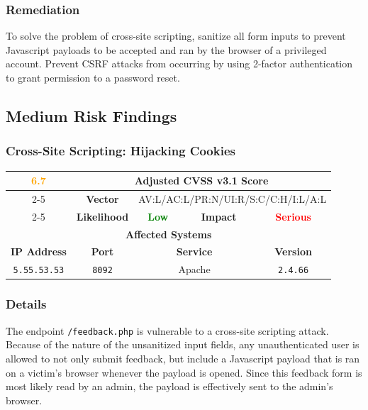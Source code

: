 \documentclass[12pt, letterpaper]{article}
\begin{document}
\subsubsection*{Remediation}

To solve the problem of cross-site scripting, sanitize all form
inputs to prevent Javascript payloads to be accepted and ran by the
browser of a privileged account. Prevent CSRF attacks from occurring
by using 2-factor authentication to grant permission to a password reset.

\clearpage
\subsection{Medium Risk Findings}
\subsubsection{Cross-Site Scripting: Hijacking Cookies}

\begin{table}[!ht]
  \centering
  \renewcommand{\arraystretch}{1.8} %
  \begin{tabular}{|c|c|c|c|c|}
    \hline
    \multirow{3}{*}{\textcolor{orange}{\textbf{\huge 6.7}}} &
    \multicolumn{4}{c|}{\textbf{Adjusted CVSS v3.1 Score}} \\ \cline{2-5}
    & \textbf{Vector} &
    \multicolumn{3}{c|}{AV:L/AC:L/PR:N/UI:R/S:C/C:H/I:L/A:L} \\ \cline{2-5}
    & \textbf{Likelihood} & \textcolor{green}{\textbf{Low}}
    & \textbf{Impact} & \textcolor{red}{\textbf{Serious}} \\ \hline
    \multicolumn{5}{|c|}{\textbf{Affected Systems}} \\ \hline
    \textbf{IP Address} & \textbf{Port} &
    \multicolumn{2}{c|}{\textbf{Service}} & \textbf{Version} \\ \hline
    \texttt{5.55.53.53} & \texttt{8092} & \multicolumn{2}{c|}{Apache}
    & \texttt{2.4.66} \\ \hline
  \end{tabular}
\end{table}
\FloatBarrier

\subsubsection*{Details}

The endpoint \texttt{/feedback.php} is vulnerable to a cross-site
scripting attack. Because of the nature of the unsanitized input
fields, any unauthenticated user is allowed to not only submit
feedback, but include a Javascript payload that is ran on a victim's
browser whenever the payload is opened. Since this feedback form is
most likely read by an admin, the payload is effectively sent to the
admin's browser.
\end{document}
